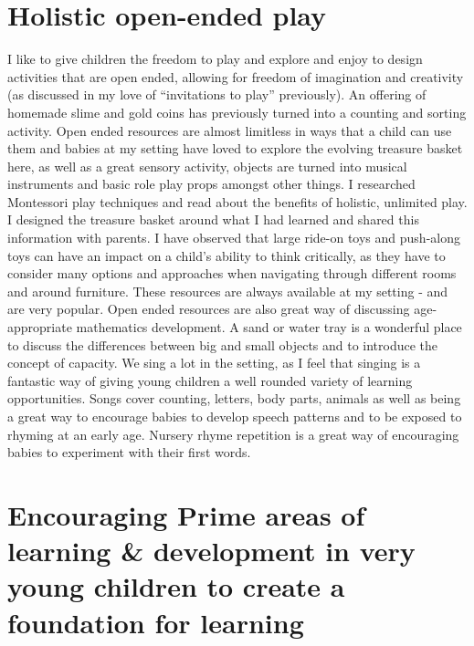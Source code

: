 \documentclass[10pt,a4paper]{report}
\begin{document}
\section{Holistic open-ended play}

I like to give children the freedom to play and explore and enjoy to design activities that are open ended, allowing for freedom of imagination and creativity (as discussed in my love of “invitations to play” previously). An offering of homemade slime and gold coins has previously turned into a counting and sorting activity. Open ended resources are almost limitless in ways that a child can use them and babies at my setting have loved to explore the evolving treasure basket here, as well as a great sensory activity, objects are turned into musical instruments and basic role play props amongst other things. I researched Montessori play techniques and read about the benefits of holistic, unlimited play. I designed the treasure basket around what I had learned and shared this information with parents. I have observed that large ride-on toys and push-along toys can have an impact on a child's ability to think critically, as they have to consider many options and approaches when navigating through different rooms and around furniture. These resources are always available at my setting - and are very popular. Open ended resources are also great way of discussing age-appropriate mathematics development. A sand or water tray is a wonderful place to discuss the differences between big and small objects and to introduce the concept of capacity. 
We sing a lot in the setting, as I feel that singing is a fantastic way of giving young children a well rounded variety of learning opportunities. Songs cover counting, letters, body parts, animals as well as being a great way to encourage babies to develop speech patterns and to be exposed to rhyming at an early age. Nursery rhyme repetition is a great way of encouraging babies to experiment with their first words. 

\section{Encouraging Prime areas of learning \& development in very young children to create a foundation for learning}
\end{document}
